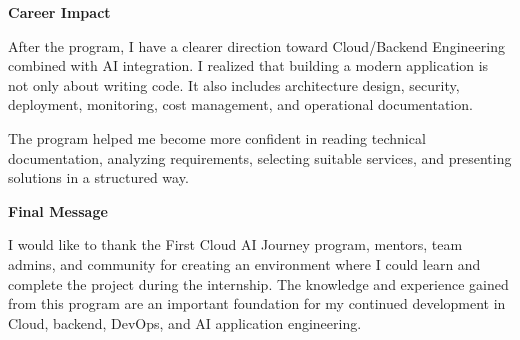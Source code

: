 \vspace{0.5em}\noindent\textbf{Career Impact}\par

After the program, I have a clearer direction toward Cloud/Backend
Engineering combined with AI integration. I realized that building a
modern application is not only about writing code. It also includes
architecture design, security, deployment, monitoring, cost management,
and operational documentation.

The program helped me become more confident in reading technical
documentation, analyzing requirements, selecting suitable services, and
presenting solutions in a structured way.

\vspace{0.5em}\noindent\textbf{Final Message}\par

I would like to thank the First Cloud AI Journey program, mentors, team
admins, and community for creating an environment where I could learn
and complete the project during the internship. The knowledge and
experience gained from this program are an important foundation for my
continued development in Cloud, backend, DevOps, and AI application
engineering.
